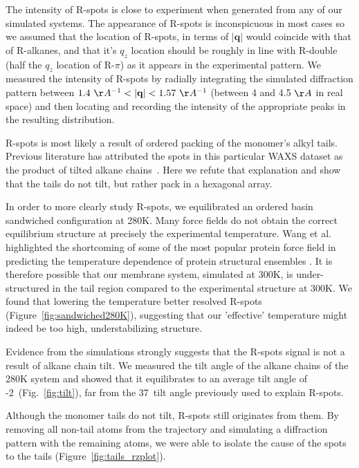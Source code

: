 \documentclass[journal=jpcbfk,manuscript=article]{achemso}
\begin{document}
  The intensity of R-spots is close to experiment when generated from any of our
  simulated systems. The appearance of R-spots is inconspicuous in most cases so we
  assumed that the location of R-spots, in terms of $|\mathbf{q}|$ would coincide with
  that of R-alkanes, and that it's $q_z$ location should be roughly in line with 
  R-double (half the $q_z$ location of R-$\pi$) as it appears in the experimental pattern.
  We measured the intensity of R-spots by radially integrating the simulated
  diffraction pattern between $1.4~\AA^{-1} < |\mathbf{q}| < 1.57~\AA^{-1}$ (between
  4 and 4.5 $\AA$ in real space) and then locating and recording the intensity of the 
  appropriate peaks in the resulting distribution.
  
  R-spots is most likely a result of ordered packing of the monomer's alkyl tails. 
  Previous literature has attributed the spots in this particular WAXS dataset as 
  the product of tilted alkane chains~\cite{feng_scalable_2014}. Here we refute 
  that explanation and show that the tails do not tilt, but rather pack in a 
  hexagonal array.

  In order to more clearly study R-spots, we equilibrated an ordered basin sandwiched 
  configuration at 280K. Many force fields do not obtain the correct equilibrium structure
  at precisely the experimental temperature. Wang et al. highlighted the shortcoming of 
  some of the most popular protein force field in predicting the temperature dependence 
  of protein structural ensembles \cite{wang_building_2017}. It is therefore possible that   %
  our membrane system, simulated at 300K, is under-structured in the tail region compared
  to the experimental structure at 300K. We found that lowering the temperature better 
  resolved R-spots (Figure~\ref{fig:sandwiched280K}), suggesting that our 'effective' 
  temperature might indeed be too high, understabilizing structure. 
 
  Evidence from the simulations strongly suggests that the R-spots signal is not a 
  result of alkane chain tilt. We measured the tilt angle of the alkane chains of
  the 280K system and showed that it equilibrates to an average tilt angle of
  -2\degree~(Fig.~\ref{fig:tilt}), far from the 37\degree~tilt angle previously
  used to explain R-spots. 

  Although the monomer tails do not tilt, R-spots still originates from 
  them. By removing all non-tail atoms from the trajectory and simulating a
  diffraction pattern with the remaining atoms, we were able to isolate the
  cause of the spots to the tails (Figure~\ref{fig:tails_rzplot}).
\end{document}
